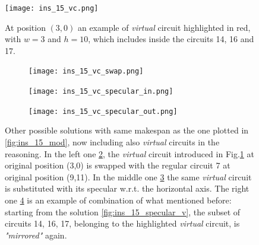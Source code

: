         \begin{figure}[H]
            \centering
            \texttt{[image: ins\_15\_vc.png]}
            \caption{
                At position $(3,0)$ an example of \textit{virtual} circuit highlighted in red,
                with $w = 3$ and $h = 10$, which includes inside the circuits 14, 16 and 17.
            }
            \label{fig:virtual circuit}
        \end{figure}

        \begin{figure}[H]
            \centering
            \begin{subfigure}[b]{0.3\textwidth}
                \centering 
                \texttt{[image: ins\_15\_vc\_swap.png]}
                \caption{}
                \label{fig:vc_swap}
            \end{subfigure}
            \hfill
            \begin{subfigure}[b]{0.3\textwidth}
                \centering
                \texttt{[image: ins\_15\_vc\_specular\_in.png]}
                \caption{}
                \label{fig:vc_specular_in}
            \end{subfigure}
            \hfill
            \begin{subfigure}[b]{0.3\textwidth}
                \centering
                \texttt{[image: ins\_15\_vc\_specular\_out.png]}
                \caption{}
                \label{fig:vc_specular_out}
            \end{subfigure}
            \caption{
                Other possible solutions with same makespan as the one plotted in \ref{fig:ins_15_mod},
                now including also \textit{virtual} circuits in the reasoning.
                In the left one \ref{fig:vc_swap}, the \textit{virtual} circuit introduced in Fig.\ref{fig:virtual circuit}
                at original position (3,0) is swapped with the regular circuit 7 at original position (9,11).
                In the middle one \ref{fig:vc_specular_in} the same \textit{virtual} circuit is substituted with 
                its specular w.r.t. the horizontal axis.
                The right one \ref{fig:vc_specular_out} is an example of combination of what mentioned before:
                starting from the solution \ref{fig:ins_15_specular_v}, the subset of circuits 14, 16, 17, belonging to 
                the highlighted \textit{virtual} circuit, is \textit{"mirrored"} again.
            }
            \label{fig:symmetry_vc}
        \end{figure}

